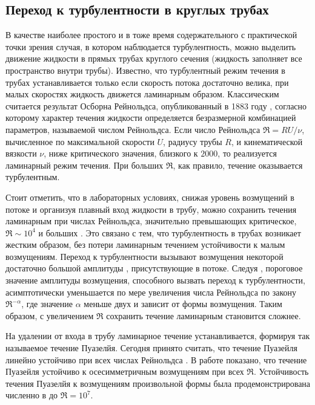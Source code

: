 	\subsection{Переход к турбулентности в круглых трубах}

В качестве наиболее простого и в тоже время содержательного с практической точки зрения случая, в котором наблюдается турбулентность, можно выделить движение жидкости в прямых трубах круглого сечения (жидкость заполняет все пространство внутри трубы). Известно, что турбулентный режим течения в трубах устанавливается только если скорость потока достаточно велика, при малых скоростях жидкость движется ламинарным образом. Классическим считается результат Осборна Рейнольдса, опубликованный в 1883 году \cite{Reynolds1883}, согласно которому характер течения жидкости определяется безразмерной комбинацией параметров, называемой числом Рейнольдса. Если число Рейнольдса $\Re = RU/\nu$, вычисленное по максимальной скорости $U$, радиусу трубы $R$, и кинематической вязкости $\nu$, ниже критического значения, близкого к $2000$, то реализуется ламинарный режим течения. При больших $\Re$, как правило, течение оказывается турбулентным. 

Стоит отметить, что в лабораторных условиях, снижая уровень возмущений в потоке и организуя плавный вход жидкости в трубу, можно сохранить течения ламинарным при числах Рейнольдса, значительно превышающих критическое, $\Re \sim 10^4$ и больших \cite{Wygnanski1973, Darbyshire1995, vanDoorne2009}. Это связано с тем, что турбулентность в трубах возникает жестким образом, без потери ламинарным течением устойчивости к малым возмущениям. Переход к турбулентности вызывают возмущения некоторой достаточно большой амплитуды \cite{Grossmann2000}, присутствующие в потоке. Следуя \cite{Darbyshire1995, Hof2003, Peixinho2007, Mellibovsky2009critical}, пороговое значение амплитуды возмущения, способного вызвать переход к турбулентности, асимптотически уменьшается по мере увеличения числа Рейнольдса по закону $\Re^{-\alpha}$, где значение $\alpha$ меньше двух и зависит от формы возмущения. Таким образом, с увеличением $\Re$ сохранить течение ламинарным становится сложнее. 

На удалении от входа в трубу ламинарное течение устанавливается, формируя так называемое течение Пуазелйя. Сегодня принято считать, что течение Пуазейля линейно устойчиво при всех числах Рейнольдса \cite{Kerswell2005}. В работе \cite{Salwen1980} показано, что течение Пуазейля устойчиво к осесимметричным возмущениям при всех $\Re$. Устойчивость течения Пуазелйя к возмущениям произвольной формы была продемонстрирована численно в \cite{Meseguer2003} до $\Re = 10^7$. 


